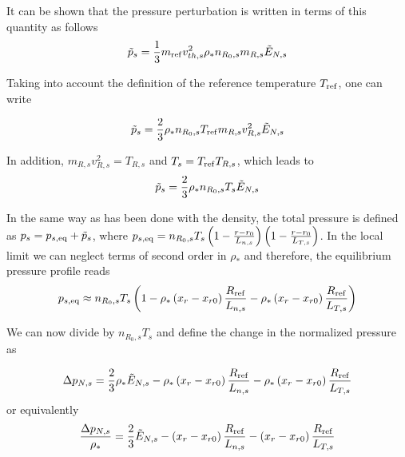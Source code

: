 It can be shown that the pressure perturbation is written in terms of this quantity as follows
\begin{equation}
\tilde{p}_s = {1\over 3}m_{\rm ref}v_{th,s}^2\rho_* n_{R_0,s}m_{R,s}\tilde E_{N,s}
\end{equation}

Taking into account the definition of the reference temperature $T_{\rm ref}$, one can write

\begin{equation}
\tilde{p}_s = {2\over 3}\rho_* n_{R_0,s}T_{\rm ref}m_{R,s}v_{R,s}^2\tilde E_{N,s}
\end{equation}

In addition, $m_{R,s}v_{R,s}^2=T_{R,s}$ and $T_s = T_{\rm ref}T_{R,s}$, which leads to
\begin{equation}
\tilde{p}_s = {2\over 3}\rho_* n_{R_0,s}T_s\tilde E_{N,s}
\end{equation}

In the same way as has been done with the density, the total pressure is defined as $p_s = p_{s,\rm eq} + \tilde{p}_s$, where $p_{s,\rm eq} = n_{R_0,s}T_s\left(1-{r-r_0\over L_{n,s}}\right)\left(1-{r-r_0\over L_{T,s}}\right)$. In the local limit we can neglect terms of second order in $\rho_*$ and therefore, the equilibrium pressure profile reads
\begin{equation}
p_{s,\rm eq} \approx n_{R_0,s}T_s\left(1-\rho_*\left(x_r-x_{r0}\right){R_{\rm ref}\over L_{n,s}}-\rho_*\left(x_r-x_{r0}\right){R_{\rm ref}\over L_{T,s}}\right)
\end{equation}

We can now divide by $n_{R_0,s}T_s$ and define the change in the normalized pressure as

\begin{equation}
\Delta p_{N,s} = {2\over 3}\rho_*\tilde E_{N,s}-\rho_*\left(x_r-x_{r0}\right){R_{\rm ref}\over L_{n,s}}-\rho_*\left(x_r-x_{r0}\right){R_{\rm ref}\over L_{T,s}}
\end{equation}
or equivalently
\begin{equation}
{\Delta p_{N,s} \over \rho_*} = {2\over 3}\tilde E_{N,s}-\left(x_r-x_{r0}\right){R_{\rm ref}\over L_{n,s}}-\left(x_r-x_{r0}\right){R_{\rm ref}\over L_{T,s}}
\end{equation}


